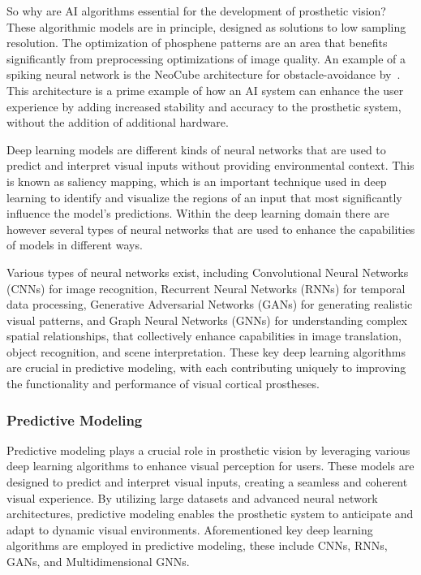 \documentclass[twocolumn,10pt]{article}
\begin{document}
So why are AI algorithms essential for the development of prosthetic vision?
These algorithmic models are in principle, designed as solutions to low sampling
resolution. The optimization of phosphene patterns are an area that benefits
significantly from preprocessing optimizations of image quality. An example of a
spiking neural network is the NeoCube architecture for obstacle-avoidance
by~\textcite{guoOptimizationVisualInformation2018}. This architecture is a prime
example of how an AI system can enhance the user experience by adding increased
stability and accuracy to the prosthetic system, without the addition of
additional hardware.

Deep learning models are different kinds of neural networks that are used to
predict and interpret visual inputs without providing environmental context.
This is known as saliency mapping, which is an important technique used in deep
learning to identify and visualize the regions of an input that most
significantly influence the model's predictions. Within the deep learning domain
there are however several types of neural networks that are used to enhance the
capabilities of models in different ways.

Various types of neural networks exist, including Convolutional Neural Networks
(CNNs) for image recognition, Recurrent Neural Networks (RNNs) for temporal data
processing, Generative Adversarial Networks (GANs) for generating realistic
visual patterns, and Graph Neural Networks (GNNs) for understanding complex
spatial relationships, that collectively enhance capabilities in image
translation, object recognition, and scene interpretation. These key deep
learning algorithms are crucial in predictive modeling, with each contributing
uniquely to improving the functionality and performance of visual cortical
prostheses.


\subsubsection*{Predictive Modeling}
Predictive modeling plays a crucial role in prosthetic vision by leveraging
various deep learning algorithms to enhance visual perception for users. These
models are designed to predict and interpret visual inputs, creating a seamless
and coherent visual experience. By utilizing large datasets and advanced neural
network architectures, predictive modeling enables the prosthetic system to
anticipate and adapt to dynamic visual environments. Aforementioned key deep
learning algorithms are employed in predictive modeling, these include CNNs,
RNNs, GANs, and Multidimensional GNNs.
\end{document}
